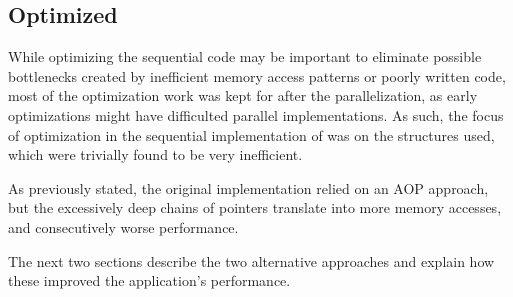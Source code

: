 \subsection{Optimized}


While optimizing the sequential code may be important to eliminate possible bottlenecks created by inefficient memory access patterns or poorly written code, most of the optimization work was kept for after the parallelization, as early optimizations might have difficulted parallel implementations.
As such, the focus of optimization in the sequential implementation of \polu was on the structures used, which were trivially found to be very inefficient.

As previously stated, the original implementation relied on an AOP approach, but the excessively deep chains of pointers translate into more memory accesses, and consecutively worse performance.

The next two sections describe the two alternative approaches and explain how these improved the application's performance.



